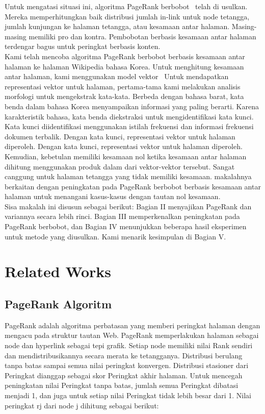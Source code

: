 \documentclass[conference]{IEEEtran}
\begin{document}
Untuk mengatasi situasi ini, algoritma PageRank berbobot~\cite{qiao2010simrank,xing2004weighted} telah di usulkan.
Mereka memperhitungkan baik distribusi jumlah in-link untuk node tetangga, jumlah kunjungan ke halaman tetangga, atau kesamaan antar halaman.
Masing-masing memiliki pro dan kontra. Pembobotan berbasis kesamaan antar halaman terdengar bagus untuk peringkat berbasis konten.\\

Kami telah mencoba algoritma PageRank berbobot berbasis kesamaan antar halaman ke halaman Wikipedia bahasa Korea. Untuk menghitung kesamaan antar halaman, kami menggunakan model vektor~\cite{}
Untuk mendapatkan representasi vektor untuk halaman, pertama-tama kami melakukan analisis morfologi untuk mengekstrak kata-kata.
Berbeda dengan bahasa barat, kata benda dalam bahasa Korea menyampaikan informasi yang paling berarti.
Karena karakteristik bahasa, kata benda diekstraksi untuk mengidentifikasi kata kunci.
Kata kunci diidentifikasi menggunakan istilah frekuensi dan informasi frekuensi dokumen terbalik. Dengan kata kunci, representasi vektor untuk halaman diperoleh.
Dengan kata kunci, representasi vektor untuk halaman diperoleh. Kemudian, kebetulan memiliki kesamaan nol ketika kesamaan antar halaman dihitung menggunakan produk dalam dari vektor-vektor tersebut.
Sangat canggung untuk halaman tetangga yang tidak memiliki kesamaan.
makalahnya berkaitan dengan peningkatan pada PageRank berbobot berbasis kesamaan antar halaman untuk menangani kasus-kasus dengan tautan nol kesamaan.\\

Sisa makalah ini disusun sebagai berikut: Bagian II menyajikan PageRank dan variannya secara lebih rinci.
Bagian III memperkenalkan peningkatan pada PageRank berbobot, dan Bagian IV menunjukkan beberapa hasil eksperimen untuk metode yang diusulkan.
Kami menarik kesimpulan di Bagian V.

\section{Related Works}
\subsection{PageRank Algoritm}
PageRank\cite{brin1998anatomy} adalah algoritma perbatasan yang memberi peringkat halaman dengan mengacu pada struktur tautan Web.
PageRank memperlakukan halaman sebagai node dan hyperlink sebagai tepi grafik.
Setiap node memiliki nilai Rank sendiri dan mendistribusikannya secara merata ke tetangganya.
Distribusi berulang tanpa batas sampai semua nilai peringkat konvergen.
Distribusi stasioner dari Peringkat dianggap sebagai skor Peringkat akhir halaman.
Untuk mencegah peningkatan nilai Peringkat tanpa batas, jumlah semua Peringkat dibatasi menjadi 1, dan juga untuk setiap nilai Peringkat tidak lebih besar dari 1.
Nilai peringkat rj dari node j dihitung sebagai berikut:
\end{document}
